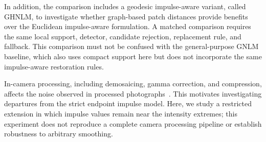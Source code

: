 \documentclass[pdflatex,iicol,sn-mathphys-num]{sn-jnl}
\newif\ifshowportuguese
\newcommand{\pt}[1]{\ifshowportuguese\par\begingroup\small\color{blue!55!black}\noindent\textbf{PT: }#1\par\endgroup\fi}
\begin{document}
In addition, the comparison includes a geodesic impulse-aware variant, called GHNLM, to investigate whether graph-based patch distances provide benefits over the Euclidean impulse-aware formulation. A matched comparison requires the same local support, detector, candidate rejection, replacement rule, and fallback. This comparison must not be confused with the general-purpose GNLM baseline, which also uses compact support here but does not incorporate the same impulse-aware restoration rules.
\pt{Além disso, a comparação inclui uma variante geodésica orientada a impulsos, denominada GHNLM, para investigar se distâncias entre patches baseadas em grafos oferecem benefícios em relação à formulação Euclidiana orientada a impulsos. Uma comparação correspondente exige o mesmo suporte local, detector, rejeição de candidatos, regra de substituição e fallback. Essa comparação não deve ser confundida com o baseline GNLM de propósito geral, que também usa suporte compacto aqui, mas não incorpora as mesmas regras de restauração orientadas a impulsos.}


In-camera processing, including demosaicing, gamma correction, and compression, affects the noise observed in processed photographs~\cite{guo2019real}. This motivates investigating departures from the strict endpoint impulse model. Here, we study a restricted extension in which impulse values remain near the intensity extremes; this experiment does not reproduce a complete camera processing pipeline or establish robustness to arbitrary smoothing.
\pt{O processamento interno das câmeras, incluindo demosaicing, correção gama e compressão, afeta o ruído observado nas fotografias processadas~\cite{guo2019real}. Isso motiva investigar desvios em relação ao modelo de impulsos estritamente nos extremos. Neste trabalho, estudamos uma extensão restrita em que os valores impulsivos permanecem próximos dos extremos de intensidade; esse experimento não reproduz um pipeline completo de processamento de câmera nem estabelece robustez a suavizações arbitrárias.}
\end{document}
